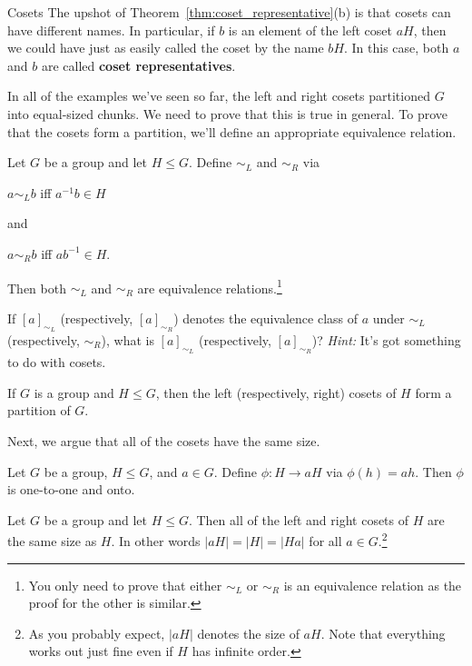 \begin{section}{Cosets}
The upshot of Theorem~\ref{thm:coset_representative}(b) is that cosets can have different names.  In particular, if $b$ is an element of the left coset $aH$, then we could have just as easily called the coset by the name $bH$.  In this case, both $a$ and $b$ are called \textbf{coset representatives}.

In all of the examples we've seen so far, the left and right cosets partitioned $G$ into equal-sized chunks.  We need to prove that this is true in general.  To prove that the cosets form a partition, we'll define an appropriate equivalence relation.

\begin{theorem}
Let $G$ be a group and let $H\leq G$.  Define $\sim_L$ and $\sim_R$ via 
\begin{center}
$a\sim_L b$ iff $a^{-1}b\in H$
\end{center}
and
\begin{center}
$a\sim_R b$ iff $ab^{-1}\in H$.
\end{center}
Then both $\sim_L$ and $\sim_R$ are equivalence relations.\footnote{You only need to prove that either $\sim_L$ or $\sim_R$ is an equivalence relation as the proof for the other is similar.}
\end{theorem}

\begin{problem}
If $[a]_{\sim_L}$ (respectively, $[a]_{\sim_R}$) denotes the equivalence class of $a$ under $\sim_L$ (respectively, $\sim_R$), what is $[a]_{\sim_L}$ (respectively, $[a]_{\sim_R}$)?  \emph{Hint:} It's got something to do with cosets.
\end{problem}

\begin{corollary}
If $G$ is a group and $H\leq G$, then the left (respectively, right) cosets of $H$ form a partition of $G$.
\end{corollary}

Next, we argue that all of the cosets have the same size.

\begin{theorem}
Let $G$ be a group, $H\leq G$, and $a\in G$.  Define $\phi:H\to aH$ via $\phi(h)=ah$.  Then $\phi$ is one-to-one and onto.
\end{theorem}

\begin{corollary}\label{cor:cosets_same_size}
Let $G$ be a group and let $H\leq G$.  Then all of the left and right cosets of $H$ are the same size as $H$.  In other words $|aH|=|H|=|Ha|$ for all $a\in G$.\footnote{As you probably expect, $|aH|$ denotes the size of $aH$. Note that everything works out just fine even if $H$ has infinite order.}
\end{corollary}

\end{section}

